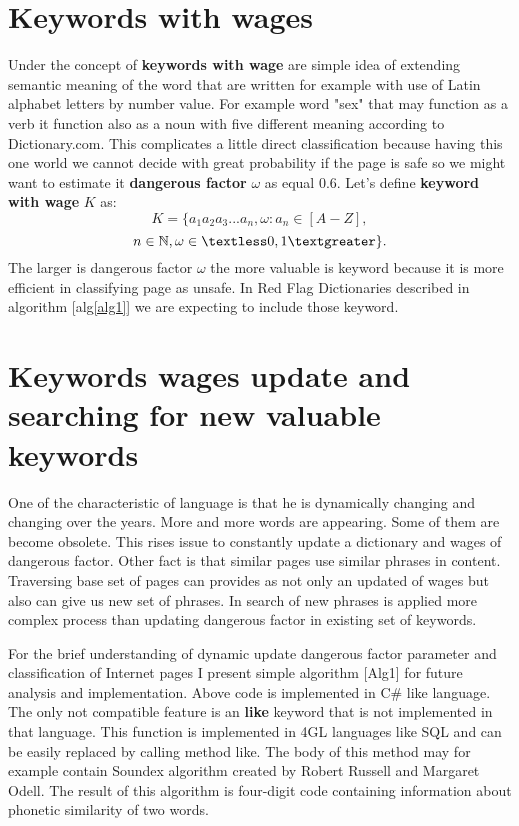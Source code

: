 \documentclass[9pt,a4paper]{extarticle}
\begin{document}
\begin{multicols}{2}
\section{Keywords with wages}
Under the concept of \textbf{keywords with wage} are simple idea of extending semantic meaning of the word that are written for example with use of Latin alphabet letters by number value. For example word "sex" that may function as a verb it function also as a noun with five different meaning according to Dictionary.com\cite{noauthor_dictionary.com_2018}. This complicates a little direct classification because having this one world we cannot decide with great probability if the page is safe so we might want to estimate it \textbf{dangerous factor} \(\omega\) as equal 0.6. Let's define \textbf{keyword with wage} \(K\) as:
$$
K = \{a_1a_2a_3...a_n, \omega : a_n \in [A-Z], 
$$
$$
n \in \mathbb{N}, \omega \in \textless0,1\textgreater\}.
$$
The larger is dangerous factor \(\omega\) the more valuable is keyword because it is more efficient in classifying page as unsafe. In Red Flag Dictionaries described in algorithm [alg\ref{alg1}] we are expecting to include those keyword. 

\section{Keywords wages update and searching for new valuable keywords}
One of the characteristic of language is that he is dynamically changing and changing over the years.  More and more words are appearing. Some of them are become obsolete. This rises issue to constantly update a dictionary and wages of dangerous factor. Other fact is that similar pages use similar phrases in content. Traversing base set of pages can provides as not only an updated of wages but also can give us new set of phrases. In search of new phrases is applied more complex process than updating dangerous factor in existing set of keywords.

For the brief understanding of dynamic update dangerous factor parameter and classification of Internet pages I present simple algorithm [Alg1] for future analysis and implementation. Above code is implemented in C\# like language. The only not compatible feature is an \textbf{like} keyword that is not implemented in that language. This function is implemented in 4GL languages like SQL and can be easily replaced by calling method like. The body of this method may for example contain Soundex algorithm created by Robert Russell and Margaret Odell\cite{donald_e._knuth_art_2002}. The result of this algorithm is four-digit code containing information about phonetic similarity of two words.


\end{multicols}
\end{document}
